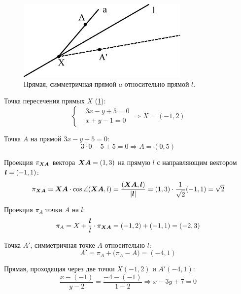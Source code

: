 \documentclass[a4paper,12pt]{article}
\begin{document}
  \begin{solution}
    \begin{figure}[h]
      \centering
      
      \includegraphics[width=0.75\textwidth]{symmetrice}
      
      \caption{Прямая, симметричная прямой $a$ относительно прямой $l$.}
      \label{fig:symmetrice}
    \end{figure}

    Точка пересечения прямых $X$ (\ref{fig:symmetrice}):
    \[
      \left\{\begin{aligned}
        &3x - y + 5 = 0\\
        &x + y - 1 = 0
      \end{aligned}\right.
      \Rightarrow X = (-1, 2)
    \]

    Точка $A$ на прямой $3x - y + 5 = 0$:
    \[
      3 \cdot 0 - 5 + 5 = 0
      \Rightarrow A = (0, 5)
    \]
    
    Проекция $\pi_{\boldsymbol{XA}}$ вектора $\bds{XA} \hm= (1, 3)$ на прямую $l$ с направляющим вектором $\boldsymbol l = (-1, 1)$:
    \[
      \pi_{\boldsymbol{XA}} = \boldsymbol{XA} \cdot \cos \angle(\boldsymbol{XA}, l)
      = \frac{(\boldsymbol{XA}, \boldsymbol l)}{|\boldsymbol l|}
      = (1, 3) \cdot \frac{1}{\sqrt 2} (-1, 1)
      = \sqrt 2
    \]

    Проекция $\pi_A$ точки $A$ на $l$:
    \[
      \pi_A = X + \frac{\boldsymbol l}{l} \cdot \pi_{\boldsymbol{XA}}
      = (-1, 2) + (-1, 1) = (-2, 3)
    \]

    Точка $A'$, симметричная точке $A$ относительно $l$:
    \[
      A' = \pi_A + \bigl(\pi_A - A\bigr) = (-4, 1)
    \]

    Прямая, проходящая через две точки $X(-1, 2)$ и $A'(-4, 1)$:
    \[
      \frac{x - (-1)}{y - 2} = \frac{-4 - (-1)}{1 - 2}
      \Rightarrow
      \boxed{x - 3y + 7 = 0}
    \]
  \end{solution}
  
  
\end{document}
